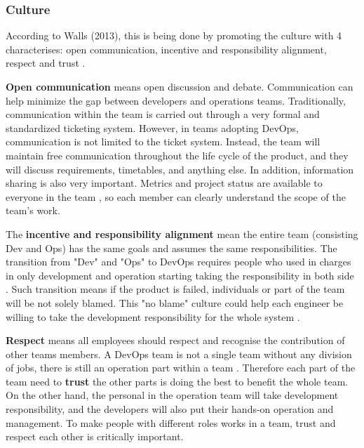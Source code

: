 \subsubsection[]{Culture}
 According to Walls (2013), this is being done by promoting the culture with 4 characterises: open communication, incentive and responsibility alignment, respect and trust \cite{walls2013building}.
\par 
\textbf{Open communication} means open discussion and debate. Communication can help minimize the gap between developers and operations teams. Traditionally, communication within the team is carried out through a very formal and standardized ticketing system.
However, in teams adopting DevOps, communication is not limited to the ticket system. Instead, the team will maintain free communication throughout the life cycle of the product, and they will discuss requirements, timetables, and anything else. In addition, information sharing is also very important\cite{lwakatare2015dimensions}. Metrics and project status are available to everyone in the team \label{moniter}, so each member can clearly understand the scope of the team's work.
\par
The \textbf{incentive and responsibility alignment} mean the entire team (consisting Dev and Ops) has the same goals and assumes the same responsibilities. The transition from "Dev" and "Ops" to DevOps requires people who used in charges in only development and operation starting taking the responsibility in both side \cite{lwakatare2015dimensions}.
Such transition means if the product is failed, individuals or part of the team will be not solely blamed. 
This "no blame" culture could help each engineer be willing to take the development responsibility for the whole system \cite{feitelson2013development}.
\par 
\textbf{Respect} means all employees should respect and recognise the contribution of other teams members. A DevOps team is not a single team without any division of jobs, there is still an operation part within a team \cite{TheresNo86:online}. Therefore each part of the team need to \textbf{trust} the other parts is doing the best to benefit the whole team.
On the other hand, the personal in the operation team will take development responsibility, and the developers will also put their hands-on operation and management\cite{shropshire2017uncertainty}. To make people with different roles works in a team, trust and respect each other is critically important. 
